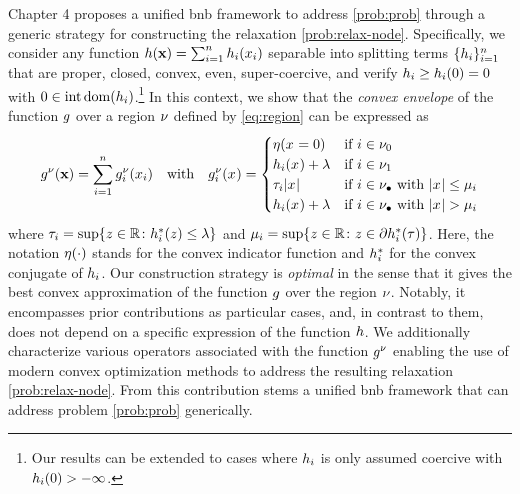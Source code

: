 \documentclass[11pt]{article}
\begin{document}
Chapter 4 proposes a unified \gls{bnb} framework to address \eqref{prob:prob} through a generic strategy for constructing the relaxation \eqref{prob:relax-node}.
Specifically, we consider any function $h(\mathbf{x}) = \sum_{i=1}^{n}h_{i}(x_{i})$ separable into splitting terms $\{h_{i}\}_{i=1}^{n}$ that are proper, closed, convex, even, super-coercive, and verify $h_{i} \geq h_{i}(0) = 0$ with $0 \in \operatorname{int}\operatorname{dom}(h_{i})$.\footnote{Our results can be extended to cases where $h_{i}$ is only assumed coercive with $h_{i}(0) > -\infty$.}
In this context, we show that the \emph{convex envelope} of the function $g$ over a region $\nu$ defined by \eqref{eq:region} can be expressed as
\begin{equation}
    g^\nu(\mathbf{x}) = \sum_{i=1}^{n}g_{i}^\nu(x_{i})
    \quad\text{with}\quad
    g_{i}^\nu(x_{}) = 
    \begin{cases}
        \eta(x_{} = 0) &\text{if } i \in \nu_0 \\
        h_{i}(x_{}) + \lambda &\text{if } i \in \nu_1 \\
        \tau_{i} |x_{}| &\text{if } i \in \nu_\bullet \text{ with }|x_{}| \leq \mu_{i} \\
        h_{i}(x_{}) + \lambda &\text{if } i \in \nu_\bullet \text{ with }|x_{}| > \mu_{i}
    \end{cases}
\end{equation}
where $\separable{\pslope}{\idxentry} = \sup\kset{\bvi{} \in \kR}{\conj{\separable{\pfunc}{\idxentry}}(\bvi{}) \leq \reg}$ and $\separable{\plimit}{\idxentry} = \sup\kset{\bvi{} \in \kR}{\bvi{} \in \subdiff\conj{\separable{\pfunc}{\idxentry}}(\pslope)}$.
Here, the notation $\eta(\cdot)$ stands for the convex indicator function and $h_{i}^{*}$ for the convex conjugate of $h_{i}$.
Our construction strategy is \emph{optimal} in the sense that it gives the best convex approximation of the function $g$ over the region $\nu$.
Notably, it encompasses prior contributions as particular cases, and, in contrast to them, does not depend on a specific expression of the function $h$.
We additionally characterize various operators associated with the function $g^\nu$ enabling the use of modern convex optimization methods to address the resulting relaxation \eqref{prob:relax-node}.
From this contribution stems a unified \gls{bnb} framework that can address problem \eqref{prob:prob} generically.
\end{document}
